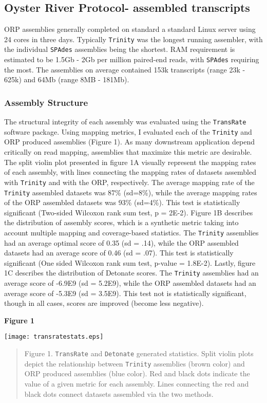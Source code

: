 \documentclass[10pt,letterpaper]{article}
\begin{document}
\subsection{Oyster River Protocol- assembled transcripts} 

ORP assemblies generally completed on standard a standard Linux server using 24 cores in three days. Typically \texttt{Trinity} was the longest running assembler, with the individual \texttt{SPAdes} assemblies being the shortest. RAM requirement is estimated to be 1.5Gb - 2Gb per million paired-end reads, with \texttt{SPAdes} requiring the most. The assemblies on average contained 153k transcripts (range 23k - 625k) and 64Mb (range 8MB - 181Mb). 

\subsubsection{Assembly Structure}

The structural integrity of each assembly was evaluated using the \texttt{TransRate} software package. Using mapping metrics, I evaluated each of the \texttt{Trinity} and ORP produced assemblies (Figure 1). As many downstream application depend critically on read mapping, assemblies that maximize this metric are desirable. The split violin plot presented in figure 1A visually represent the mapping rates of each assembly, with lines connecting the mapping rates of datasets assembled with \texttt{Trinity} and with the ORP, respectively. The average mapping rate of the \texttt{Trinity} assembled datasets was 87\% (sd=8\%), while the average mapping rates of the ORP assembled datasets was 93\% (sd=4\%). This test is statistically significant (Two-sided Wilcoxon rank sum test, p = 2E-2). Figure 1B describes the distribution of assembly scores, which is a synthetic metric taking into account multiple mapping and coverage-based statistics. The \texttt{Trinity} assemblies had an average optimal score of 0.35 (sd = .14), while the ORP assembled datasets had an average score of 0.46 (sd = .07). This test is statistically significant (One sided Wilcoxon rank sum test, p-value = 1.8E-2). Lastly, figure 1C describes the distribution of Detonate scores. The \texttt{Trinity} assemblies had an average score of -6.9E9 (sd = 5.2E9), while the ORP assembled datasets had an average score of -5.3E9 (sd = 3.5E9). This test not is statistically significant, though in all cases, scores are improved (become less negative).      


\textbf{\hypertarget{Figure 1}{Figure 1}} \\
\centerline{\texttt{[image: transratestats.eps]}}
\begin{quote}
\small{Figure 1. \texttt{TransRate} and \texttt{Detonate} generated statistics. Split violin plots depict the relationship between \texttt{Trinity} assemblies (brown color) and ORP produced assemblies (blue color). Red and black dots indicate the value of a given metric for each assembly. Lines connecting the red and black dots connect datasets assembled via the two methods. }
\end{quote} 
\end{document}
